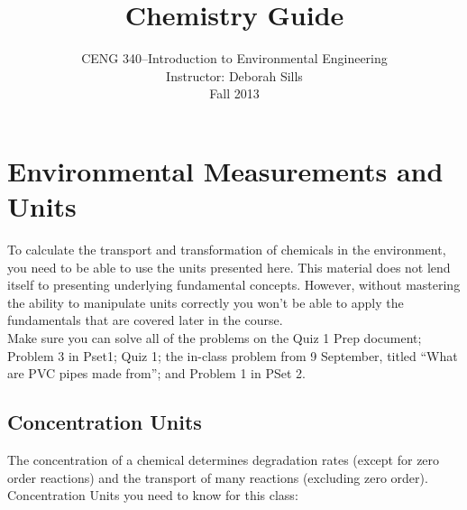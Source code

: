 \documentclass[12pt,letterpaper]{article}
\begin{document}
\setlength{\parindent}{0cm} 


\frenchspacing

\title {Chemistry Guide} 
\author {CENG 340--Introduction to Environmental Engineering\\
Instructor: Deborah Sills\\Fall 2013}
 
\maketitle

\section {Environmental Measurements and Units}
To calculate the transport and transformation of chemicals in the environment, you need to be able to use the units presented here.  This material does not lend itself to presenting underlying fundamental concepts.  However, without mastering the ability to manipulate units correctly you won't be able to apply the fundamentals that are covered later in the course.\\

Make sure you can solve all of the problems on the Quiz 1 Prep document; Problem 3 in Pset1; Quiz 1; the in-class problem from 9 September, titled ``What are PVC pipes made from''; and Problem 1 in PSet 2.  

\subsection {Concentration Units}
The concentration of a chemical determines degradation rates (except for zero order reactions) and the transport of many reactions (excluding zero order).\\  

Concentration Units you need to know for this class:
\end{document}

